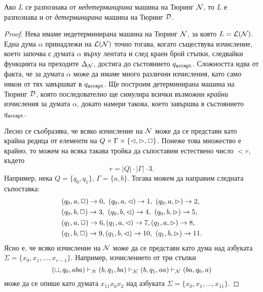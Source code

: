 \begin{important}
  \begin{theorem}
    Ако $L$ се разпознава от {\em недетерминирана} машина на Тюринг $\mathcal{N}$, то $L$
    е разпознава и от {\em детерминирана} машина на Тюринг $\mathcal{D}$.
  \end{theorem}
\end{important}
\begin{proof}
  Нека имаме недетерминирана машина на Тюринг $\mathcal{N}$, за която $L = \mathcal{L}(\mathcal{N})$.
  Една дума $\alpha$ принадлежи на $\mathcal{L}(\mathcal{N})$ точно тогава, когато съществува изчисление,
  което започва с думата $\alpha$ върху лентата и след краен брой стъпки, следвайки функцията на преходите $\Delta_{\mathcal{N}}$,
  достига до състоянието $q_{\texttt{accept}}$.
  Сложността идва от факта, че за думата $\alpha$ може да имаме много различни изчисления, 
  като само някои от тях завършват в $q_{\texttt{accept}}$. Ще построим детерминирана машина на Тюринг $\mathcal{D}$,
  която последователно ще симулира всички възможни {\em крайни} изчисления за думата $\alpha$, докато 
  намери такова, което завършва в състоянието $q_{\texttt{accept}}$.
  
  Лесно се съобразява, че всяко изчисление на $\mathcal{N}$ може да се представи като 
  крайна редица от елементи на $Q \times \Gamma \times \{\lhd,\rhd,\Box\}$.
  Понеже това множество е крайно, то можем на всяка такава тройка да
  съпоставим естествено число $ < r$, където 
  \[r = |Q| \cdot |\Gamma| \cdot 3.\]
  Например, нека $Q = \{q_0,q_1\}$, $\Gamma = \{a,b\}$. Тогава можем да направим следната съпоставка:
  \begin{align*}
    & (q_0,a,\stay) \to 0,\ (q_0,a,\goleft) \to 1,\ (q_0,a,\goright) \to 2,\\
    & (q_0,b,\stay) \to 3,\ (q_0,b,\goleft) \to 4, \ (q_0,b,\goright) \to 5,\\
    & (q_1,a,\stay) \to 6, (q_1,a,\goleft) \to 7, (q_1,a,\goright) \to 8,\\
    & (q_1,b,\stay) \to 9, (q_1,b,\goleft) \to 10,\ (q_1,b,\goright) \to 11.
  \end{align*}
  Ясно е, че всяко изчисление на $\mathcal{N}$ може да се представи като дума над азбуката $\Sigma = \{x_0,x_1,\dots,x_{r-1}\}$.
  Например, изчислението от три стъпки
  \[(\sqcup,q_0,aba) \vdash_N (b,q_1,ba) \vdash_{\mathcal{N}} (b,q_1,aa) \vdash_{\mathcal{N}} (ba,q_0,a)\]
  може да се опише като думата $x_{11}x_6x_2$ над азбуката $\Sigma = \{x_0,x_1,\dots,x_{11}\}$.
  

\end{proof}
